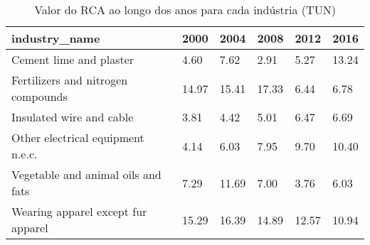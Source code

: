 \begin{table}
\centering
\caption{Valor do RCA ao longo dos anos para cada indústria (TUN)}
\begin{tabular}{p{6cm}p{1.5cm}p{1.5cm}p{1.5cm}p{1.5cm}p{1.5cm}}
\toprule
                     industry\_name &  2000 &  2004 &  2008 &  2012 &  2016 \\
\midrule
           Cement lime and plaster &  4.60 &  7.62 &  2.91 &  5.27 & 13.24 \\
Fertilizers and nitrogen compounds & 14.97 & 15.41 & 17.33 &  6.44 &  6.78 \\
          Insulated wire and cable &  3.81 &  4.42 &  5.01 &  6.47 &  6.69 \\
 Other electrical equipment n.e.c. &  4.14 &  6.03 &  7.95 &  9.70 & 10.40 \\
Vegetable and animal oils and fats &  7.29 & 11.69 &  7.00 &  3.76 &  6.03 \\
Wearing apparel except fur apparel & 15.29 & 16.39 & 14.89 & 12.57 & 10.94 \\
\bottomrule
\end{tabular}
\end{table}
